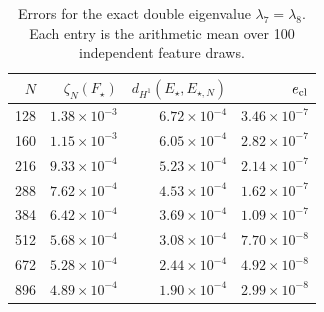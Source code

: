 \begin{table}[!htbp]
\centering
\small
\setlength{\tabcolsep}{4pt}
\caption{Errors for the exact double eigenvalue \(\lambda_7=\lambda_8\).  Each entry is the arithmetic mean over 100 independent feature draws.}
\label{tab:experiment1_h1_middle}
\begin{tabular}{rrrr}
\toprule
$N$ & $\zeta_N(F_\star)$ & $d_{H^1}(E_\star,E_{\star,N})$ & $e_{\rm cl}$\\
\midrule
128 & \(1.38\times 10^{-3}\) & \(6.72\times 10^{-4}\) & \(3.46\times 10^{-7}\)\\
160 & \(1.15\times 10^{-3}\) & \(6.05\times 10^{-4}\) & \(2.82\times 10^{-7}\)\\
216 & \(9.33\times 10^{-4}\) & \(5.23\times 10^{-4}\) & \(2.14\times 10^{-7}\)\\
288 & \(7.62\times 10^{-4}\) & \(4.53\times 10^{-4}\) & \(1.62\times 10^{-7}\)\\
384 & \(6.42\times 10^{-4}\) & \(3.69\times 10^{-4}\) & \(1.09\times 10^{-7}\)\\
512 & \(5.68\times 10^{-4}\) & \(3.08\times 10^{-4}\) & \(7.70\times 10^{-8}\)\\
672 & \(5.28\times 10^{-4}\) & \(2.44\times 10^{-4}\) & \(4.92\times 10^{-8}\)\\
896 & \(4.89\times 10^{-4}\) & \(1.90\times 10^{-4}\) & \(2.99\times 10^{-8}\)\\
\bottomrule
\end{tabular}
\end{table}
